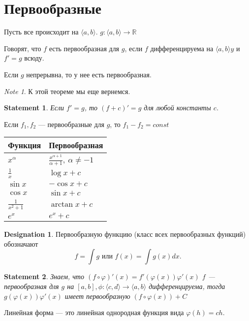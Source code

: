 \documentclass[11pt]{book}
\newcommand{\R}{\mathbb{R}}
\theoremstyle{definition}
\theoremstyle{plain}
\theoremstyle{plain}
\newtheorem*{st}{Statement}
\theoremstyle{definition}
\newtheorem*{name}{Designation}
\theoremstyle{remark}
\newtheorem*{note}{Note}
\begin{document}
\section{Первообразные}
Пусть все происходит на $ \langle a, b \rangle$. $ g : \langle a, b \rangle \to  \R$
\begin{defn}
    Говорят, что $ f$ есть первообразная для $ g$, если $ f$ дифференцируема на $ \langle a, b \rangle y$ и $ f' = g$ всюду.
\end{defn}
\begin{thm}
    Если $ g$   непрерывна, то у нее есть первообразная.
\end{thm}
\begin{note}
    К этой теореме мы еще вернемся.
\end{note}
\begin{st}
    Если $ f' = g$, то $ (f + c)' = g$ для любой константы  $ c$.
\end{st}
\begin{thm}
    Если $ f_1, f_2$ --- первообразные для $ g$, то $ f_1 - f_2 = const$
\end{thm}
\renewcommand{\arraystretch}{1.5}
\begin{tabular}[ht]{l|l}
    Функция & Первообразная \\
    \hline
    $ x^{ \alpha }$ & $ \frac{x^{ \alpha + 1}}{\alpha + 1}, ~ \alpha \ne -1$\\
    \hline
    $ \frac{1}{x}$ & $ \log x + c$ \\
    \hline
    $ \sin x$ & $ -\cos x + c$\\
    \hline
    $ \cos x$ & $ \sin x + c$\\
    \hline
    $ \frac{1}{x^2+1}$ & $ \arctan x + c$\\
    \hline
    $ e^{x}$ & $ e^{x} + c$ 
\end{tabular}
\begin{name}
    Первообразную функцию (класс всех первообразных функций) обозначают
    \[
	f = \int g \text{ или } f(x) = \int g(x) dx
    .\]
\end{name}
\begin{st}
Знаем, что $(f \circ \varphi)'(x) = f'(\varphi(x))\varphi'(x)$
$f$ --- первообразная для $g$ на $[a, b], \phi: \langle c, d \rangle \to \langle a, b \rangle$ дифференцируема, тогда $g(\varphi(x))\varphi'(x)$ имеет первообразную $(f \circ \varphi (x)) + C$
\end{st}
\begin{defn}
    Линейная форма --- это линейная однородная функция вида $ \varphi  (h) = ch$.
\end{defn}
\end{document}
